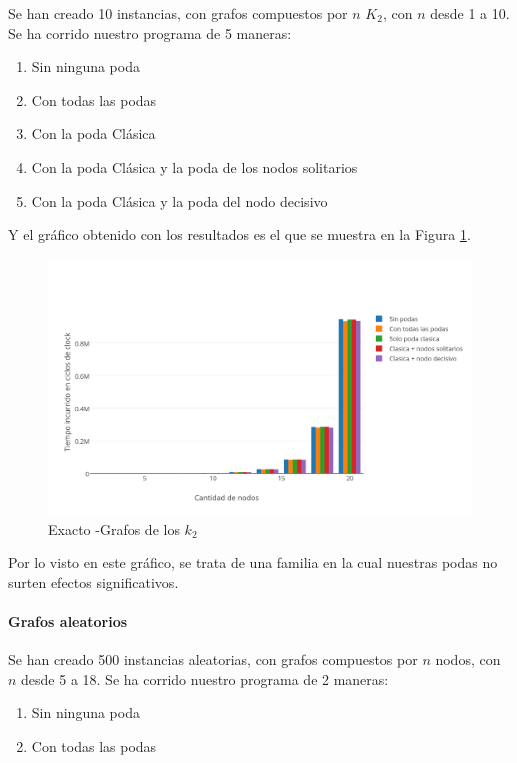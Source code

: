 Se han creado 10 instancias, con grafos compuestos por $n$ $K_2$, con $n$ desde 1 a 10. Se ha corrido nuestro programa de 5 maneras:

\begin{enumerate}
	\item Sin ninguna poda
	\item Con todas las podas 
	\item Con la poda Clásica
	\item Con la poda Clásica y la poda de los nodos solitarios
	\item Con la poda Clásica y la poda del nodo decisivo
\end{enumerate}

Y el gráfico obtenido con los resultados es el que se muestra en la Figura \ref{fig:1E}.

\begin{figure}[htb]
	\begin{center}
    		\includegraphics[scale=0.8]{imagenes/exacto-k2ord.png}
	\end{center}
	\caption{Exacto -Grafos de los $k_2$}\label{fig:1E}
\end{figure}

Por lo visto en este gráfico, se trata de una familia en la cual nuestras podas no surten efectos significativos.

\paragraph{Grafos aleatorios}

Se han creado 500 instancias aleatorias, con grafos compuestos por $n$ nodos, con $n$ desde 5 a 18. Se ha corrido nuestro programa de 2 maneras:

\begin{enumerate}
	\item Sin ninguna poda
	\item Con todas las podas 
\end{enumerate}


